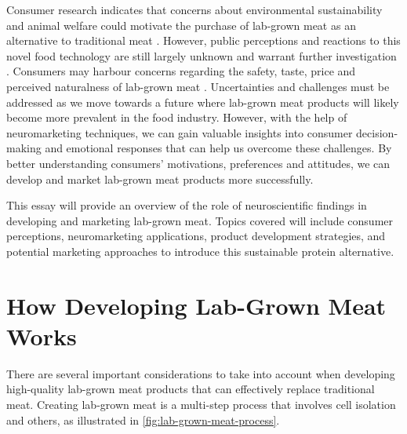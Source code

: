 \documentclass[10pt]{article}
\begin{document}
\begin{sloppypar}
  Consumer research indicates that concerns about environmental sustainability and animal welfare could motivate the purchase of lab-grown meat as an alternative to traditional meat \citep{circus_exploring_2018}. However, public perceptions and reactions to this novel food technology are still largely unknown and warrant further investigation \citep{verbeke_would_2015}. Consumers may harbour concerns regarding the safety, taste, price and perceived naturalness of lab-grown meat \citep{bryant_consumer_2018}. Uncertainties and challenges must be addressed as we move towards a future where lab-grown meat products will likely become more prevalent in the food industry. However, with the help of neuromarketing techniques, we can gain valuable insights into consumer decision-making and emotional responses that can help us overcome these challenges. By better understanding consumers’ motivations, preferences and attitudes, we can develop and market lab-grown meat products more successfully.

  This essay will provide an overview of the role of neuroscientific findings in developing and marketing lab-grown meat. Topics covered will include consumer perceptions, neuromarketing applications, product development strategies, and potential marketing approaches to introduce this sustainable protein alternative.

  \section{How Developing Lab-Grown Meat Works}
  \label{sec:developing-lab-grown-meat}

  There are several important considerations to take into account when developing high-quality lab-grown meat products that can effectively replace traditional meat. Creating lab-grown meat is a multi-step process that involves cell isolation and others, as illustrated in \autoref{fig:lab-grown-meat-process}.


\end{sloppypar}
\end{document}
